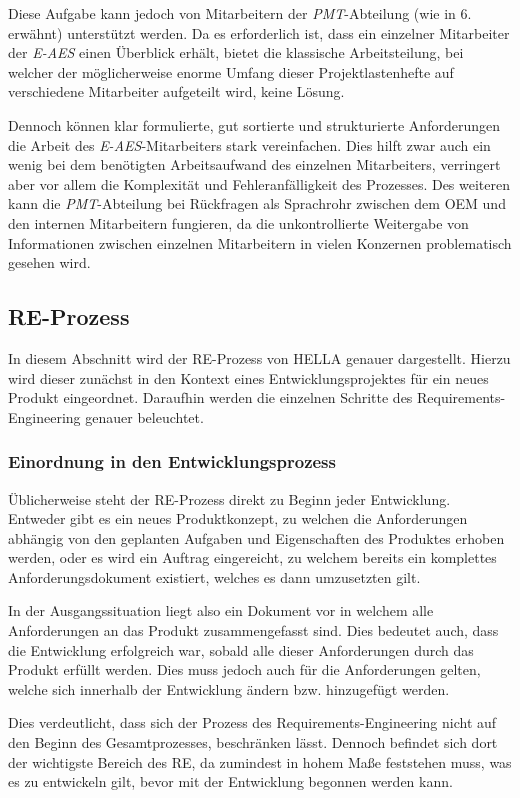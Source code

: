 \documentclass[12pt]{report}
\begin{document}
Diese Aufgabe kann jedoch von Mitarbeitern der \textit{PMT}-Abteilung (wie in 6. erwähnt) unterstützt werden. Da es erforderlich ist, dass ein einzelner Mitarbeiter der \textit{E-AES} einen Überblick erhält, bietet die klassische Arbeitsteilung, bei welcher der möglicherweise enorme Umfang dieser Projektlastenhefte auf verschiedene Mitarbeiter aufgeteilt wird, keine Lösung.

Dennoch können klar formulierte, gut sortierte und strukturierte Anforderungen die Arbeit des \textit{E-AES}-Mitarbeiters stark vereinfachen. Dies hilft zwar auch ein wenig bei dem benötigten Arbeitsaufwand des einzelnen Mitarbeiters, verringert aber vor allem die Komplexität und Fehleranfälligkeit des Prozesses. Des weiteren kann die \textit{PMT}-Abteilung bei Rückfragen als Sprachrohr zwischen dem OEM und den internen Mitarbeitern fungieren, da die unkontrollierte Weitergabe von Informationen zwischen einzelnen Mitarbeitern in vielen Konzernen problematisch gesehen wird. 
\subsection{RE-Prozess}
In diesem Abschnitt wird der RE-Prozess von HELLA genauer dargestellt. Hierzu wird dieser zunächst in den Kontext eines Entwicklungsprojektes für ein neues Produkt eingeordnet. Daraufhin werden die einzelnen Schritte des Requirements-Engineering genauer beleuchtet. 

\subsubsection{Einordnung in den Entwicklungsprozess}
Üblicherweise steht der RE-Prozess direkt zu Beginn jeder Entwicklung. Entweder gibt es ein neues Produktkonzept, zu welchen die Anforderungen abhängig von den geplanten Aufgaben und Eigenschaften des Produktes erhoben werden, oder es wird ein Auftrag eingereicht, zu welchem bereits ein komplettes Anforderungsdokument existiert, welches es dann umzusetzten gilt.

In der Ausgangssituation liegt also ein Dokument vor in welchem alle Anforderungen an das Produkt zusammengefasst sind. Dies bedeutet auch, dass die Entwicklung erfolgreich war, sobald alle dieser Anforderungen durch das Produkt erfüllt werden. Dies muss jedoch auch für die Anforderungen gelten, welche sich innerhalb der Entwicklung ändern bzw. hinzugefügt werden.

Dies verdeutlicht, dass sich der Prozess des Requirements-Engineering nicht auf den Beginn des Gesamtprozesses, beschränken lässt. Dennoch befindet sich dort der wichtigste Bereich des RE, da zumindest in hohem Maße feststehen muss, was es zu entwickeln gilt, bevor mit der Entwicklung begonnen werden kann.
\end{document}
